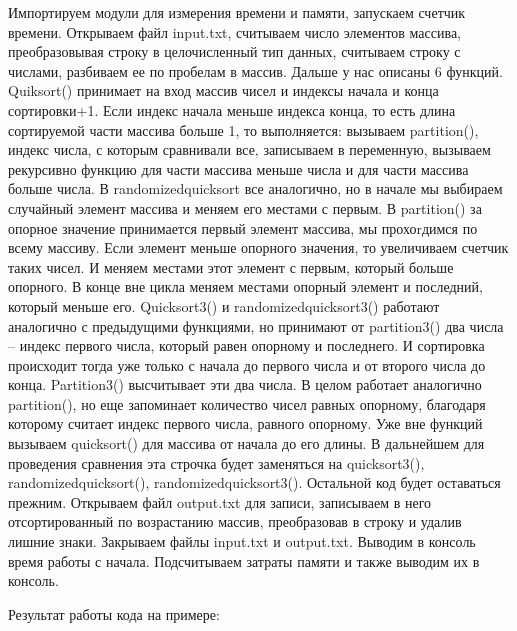 Импортируем модули для измерения времени и памяти, запускаем счетчик времени. Открываем файл input.txt, считываем число элементов массива, преобразовывая строку в целочисленный тип данных, считываем строку с числами, разбиваем ее по пробелам в массив. Дальше у нас описаны 6 функций. Quiksort() принимает на вход массив чисел и индексы начала и конца сортировки+1. Если индекс начала меньше индекса конца, то есть длина сортируемой части массива больше 1, то выполняется: вызываем partition(), индекс числа, с которым сравнивали все, записываем в переменную, вызываем рекурсивно функцию для части массива меньше числа и для части массива больше числа. В randomizedquicksort все аналогично, но в начале мы выбираем случайный элемент массива и меняем его местами с первым. В partition() за опорное значение принимается первый элемент массива, мы прохоrдимся по всему массиву. Если элемент меньше опорного значения, то увеличиваем счетчик таких чисел. И меняем местами этот элемент с первым, который больше опорного. В конце вне цикла меняем местами опорный элемент и последний, который меньше его. Quicksort3() и randomizedquicksort3() работают аналогично с предыдущими функциями, но принимают от partition3() два числа – индекс первого числа, который равен опорному и последнего. И сортировка происходит тогда уже только с начала до первого числа и от второго числа до конца. Partition3() высчитывает эти два числа. В целом работает аналогично partition(), но еще запоминает количество чисел равных опорному, благодаря которому считает индекс первого числа, равного опорному. Уже вне функций вызываем quicksort() для массива от начала до его длины. В дальнейшем для проведения сравнения эта строчка будет заменяться на quicksort3(), randomizedquicksort(), randomizedquicksort3(). Остальной код будет оставаться прежним.
Открываем файл output.txt для записи, записываем в него отсортированный по возрастанию массив, преобразовав в строку и удалив лишние знаки. Закрываем файлы input.txt и output.txt. Выводим в консоль время работы с начала. Подсчитываем затраты памяти и также выводим их в консоль.

Результат работы кода на примере:

